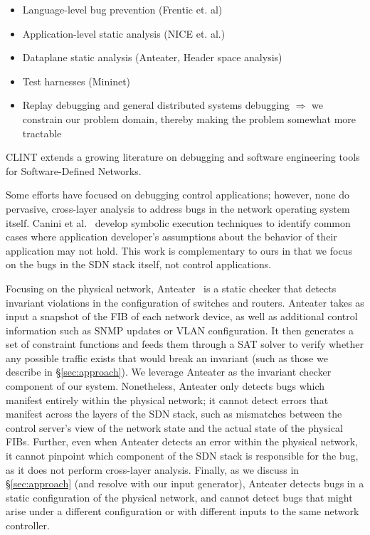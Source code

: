 \begin{itemize}

\item Language-level bug prevention (Frentic et. al)
\item Application-level static analysis (NICE et. al.)
\item Dataplane static analysis (Anteater, Header space analysis)
\item Test harnesses (Mininet)
\item Replay debugging and general distributed systems debugging $\Rightarrow$ we constrain our problem domain, thereby making the problem somewhat more tractable

\end{itemize}

CLINT extends a growing literature on debugging and software engineering tools for Software-Defined Networks.
    
Some efforts have focused on debugging control applications; however, none do pervasive,
cross-layer analysis to address bugs in the network operating system itself. 
Canini et al.~\cite{canini} develop symbolic execution techniques to identify
common cases where application developer's assumptions about the behavior of
their application may not hold. This work is complementary to ours in
that we focus on the bugs in the SDN stack itself, not control applications.

Focusing on the physical network, Anteater~\cite{anteater} is a static checker that
detects invariant violations in the configuration of switches and routers.
Anteater takes as input a snapshot of the FIB of each network device, as well as
additional control information such as SNMP updates or VLAN configuration. It then
generates a set of constraint functions and feeds them through a SAT solver to verify whether
any possible traffic exists that would break an invariant (such as those we describe in \S\ref{sec:approach}).
We leverage
Anteater as the invariant checker component of our system.
Nonetheless, Anteater only detects bugs which manifest entirely within the physical network;  
it cannot detect errors that manifest across the layers of the SDN stack, such as mismatches
between the control server's view of the network state and the actual state of the
physical FIBs. Further, even when Anteater detects an error within the physical network, it cannot pinpoint
which component of the SDN stack is responsible for the bug, as it does not perform cross-layer
analysis. Finally, as we discuss in \S\ref{sec:approach} (and resolve with our input generator), 
Anteater detects bugs in a static configuration
of the physical network, and cannot detect bugs that might arise under a different configuration or with different
inputs to the same network controller.

